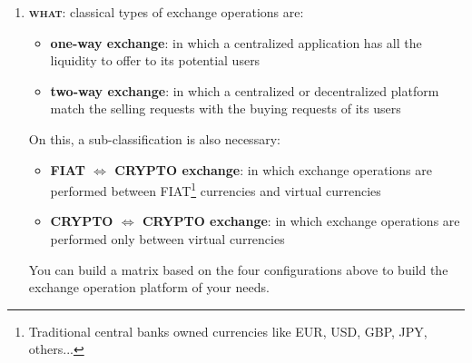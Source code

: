 \documentclass[11pt,fleqn]{book} %
\begin{document}
\begin{enumerate}
	\item \textbf{\textsc{what}}: classical types of exchange operations are: 
		\begin{itemize}
			\item \textbf{one-way exchange}: in which a centralized application has all the liquidity to offer to its potential users
			\item \textbf{two-way exchange}: in which a centralized or decentralized platform match the selling requests with the buying requests
			of its users
		\end{itemize}
		On this, a sub-classification is also necessary:
		\begin{itemize}
			\item \textbf{FIAT $\Leftrightarrow$ CRYPTO exchange}: in which exchange operations are performed between 
			FIAT\footnote{Traditional central banks owned currencies like EUR, USD, GBP, JPY, others...} 
			currencies and virtual currencies
			\item \textbf{CRYPTO $\Leftrightarrow$ CRYPTO exchange}: in which exchange operations are performed only between virtual currencies
		\end{itemize}
	You can build a matrix based on the four configurations above to build the exchange operation platform of your needs.
	\begin{tcbraster}[raster columns=3,raster rows=1,raster height=0.8cm,
		valign=center, halign=center,
		enhanced,size=small,sharp corners,colframe=azure(colorwheel),coltext=white,
		colback=azure(colorwheel),fit algorithm=hybrid* ]
		\tcboxfit{}
	\end{tcbraster}
	\begin{tcbraster}[raster columns=3,raster rows=2,raster height=5cm,
		valign=center, halign=center,
		enhanced,size=small,sharp corners,colframe=silver,coltext=black,
		colback=silver,fit algorithm=hybrid* ]
	
	\end{tcbraster}	


\end{enumerate}
\end{document}
